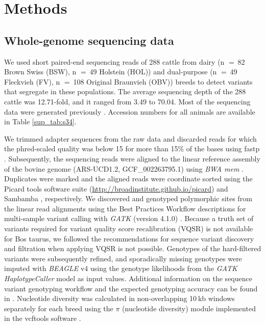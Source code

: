 \documentclass[../main.tex]{subfiles}
\begin{document}
\section{Methods}

\subsection*{Whole-genome sequencing data}

We used short paired-end sequencing reads of 288 cattle from dairy (n $=$ 82 Brown Swiss (BSW), n $=$ 49 Holstein (HOL)) and dual-purpose (n $=$ 49 Fleckvieh (FV), n $=$ 108 Original Braunvieh (OBV)) breeds to detect variants that segregate in these populations. The average sequencing depth of the 288 cattle was 12.71-fold, and it ranged from 3.49 to 70.04. Most of the sequencing data were generated previously \citep{daetwyler2014whole,crysnanto2019accurate,jansen2013assessment,baes2014evaluation,hofstetter2019non}. Accession numbers for all animals are available in Table \ref{sup_tab:s34}.

We trimmed adapter sequences from the raw data and discarded reads for which the phred-scaled quality was below 15 for more than 15\% of the bases using fastp \citep{chen2018fastp}. Subsequently, the sequencing reads were aligned to the linear reference assembly of the bovine genome (ARS-UCD1.2, GCF\_002263795.1) using \emph{BWA mem} \citep{li2013aligning}. 
Duplicates were marked and the aligned reads were coordinate sorted using the Picard tools software suite (\url{http://broadinstitute.github.io/picard}) and Sambamba \citep{tarasov2015sambamba}, respectively. We discovered and genotyped polymorphic sites from the linear read alignments using the Best Practices Workflow descriptions for multi-sample variant calling with \emph{GATK} (version 4.1.0) \citep{depristo2011framework}. Because a truth set of variants required for variant quality score recalibration (VQSR) is not available for Bos taurus, we followed the recommendations for sequence variant discovery and filtration when applying VQSR is not possible. Genotypes of the hard-filtered variants were subsequently refined, and sporadically missing genotypes were imputed with \emph{BEAGLE} v4 \citep{browning2016genotype} using the genotype likelihoods from the \emph{GATK HaplotypeCaller} model as input values. Additional information on the sequence variant genotyping workflow and the expected genotyping accuracy can be found in \citet{crysnanto2019accurate}. Nucleotide diversity was calculated in non-overlapping 10 kb windows separately for each breed using the $\pi$ (nucleotide diversity) module implemented in the vcftools software \citep{danecek2011variant}.
\end{document}
